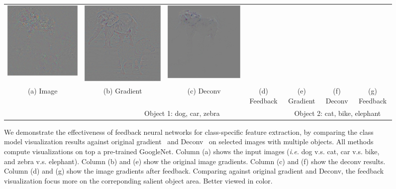 \begin{figure}
\begin{center}
\begin{tabular}{c||ccc||ccc}
\includegraphics[width=0.13\linewidth]{figs/examples/googlenet/oxford/zeb-ele2_diff_387} &
\includegraphics[width=0.13\linewidth]{figs/examples/googlenet/deconv/zeb-ele2_diff_387} &
\includegraphics[width=0.13\linewidth]{figs/examples/googlenet/soft/zeb-ele2_diff_387} \\
{\small (a) Image} &
{\small (b) Gradient} &
{\small (c) Deconv} &
{\small (d) Feedback} &
{\small (e) Gradient} &
{\small (f) Deconv} &
{\small (g) Feedback} \\
& \multicolumn{3}{c||}{Object 1: dog, car, zebra} & \multicolumn{3}{|c}{Object 2: cat, bike, elephant} \\
\end{tabular}
\caption{We demonstrate the effectiveness of feedback neural networks for class-specific feature extraction, by comparing the class model visualization results against original gradient~\cite{simonyan2013deep} and Deconv~\cite{zeiler2014visualizing} on selected images with multiple objects. All methods compute visualizations on top a pre-trained GoogleNet. Column (a) shows the input images (\emph{i.e.} dog v.s. cat, car v.s. bike, and zebra v.s. elephant). Column (b) and (e) show the original image gradients. Column (c) and (f) show the deconv results. Column (d) and (g) show the image gradients after feedback. Comparing against original gradient and Deconv, the feedback visualization focus more on the correponding salient object area. Better viewed in color.} 
\label{fig:examples}
\end{center}
\end{figure}


